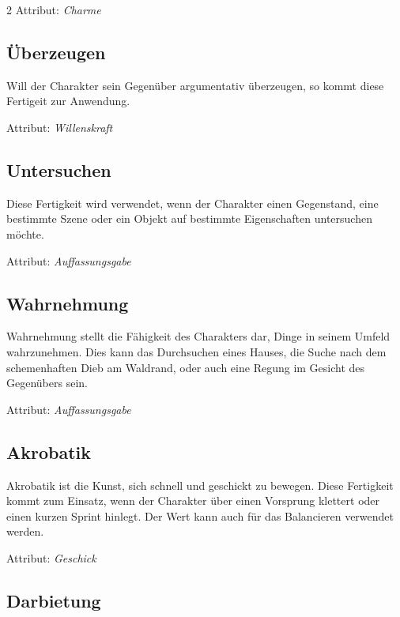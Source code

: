 \begin{multicols}{2}
Attribut: \textit{Charme}

\subsection{Überzeugen}

Will der Charakter sein Gegenüber argumentativ überzeugen, so kommt diese Fertigeit zur Anwendung.

Attribut: \textit{Willenskraft}

\subsection{Untersuchen}

Diese Fertigkeit wird verwendet, wenn der Charakter einen Gegenstand, eine bestimmte Szene oder ein Objekt auf bestimmte Eigenschaften untersuchen möchte.

Attribut: \textit{Auffassungsgabe}

\subsection{Wahrnehmung}

Wahrnehmung stellt die Fähigkeit des Charakters dar, Dinge in seinem Umfeld wahrzunehmen. Dies kann das Durchsuchen eines Hauses, die Suche nach dem schemenhaften Dieb am Waldrand, oder auch eine Regung im Gesicht des Gegenübers sein.

Attribut: \textit{Auffassungsgabe}

\subsection{Akrobatik}

Akrobatik ist die Kunst, sich schnell und geschickt zu bewegen. Diese Fertigkeit kommt zum Einsatz, wenn der Charakter über einen Vorsprung klettert oder einen kurzen Sprint hinlegt. Der Wert kann auch für das Balancieren verwendet werden.

Attribut: \textit{Geschick}

\subsection{Darbietung}


\end{multicols}
